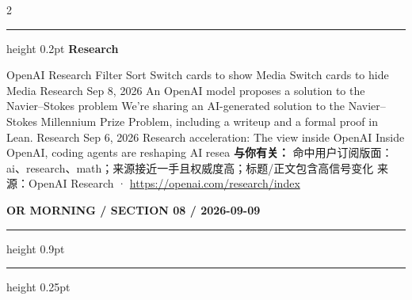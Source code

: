 \documentclass[10.5pt]{ctexart}
\begin{document}
\begin{multicols}{2}
\vspace{2mm}
\hrule height 0.2pt
\vspace{2mm}
{\large\bfseries Research}\par
OpenAI Research Filter Sort Switch cards to show Media Switch cards to hide Media Research Sep 8, 2026 An OpenAI model proposes a solution to the Navier–Stokes problem We’re sharing an AI-generated solution to the Navier–Stokes Millennium Prize Problem, including a writeup and a formal proof in Lean. Research Sep 6, 2026 Research acceleration: The view inside OpenAI Inside OpenAI, coding agents are reshaping AI resea
\textbf{与你有关：} 命中用户订阅版面：ai、research、math；来源接近一手且权威度高；标题/正文包含高信号变化
{\footnotesize\color{ormuted} 来源：OpenAI Research · \url{https://openai.com/research/index}}
\end{multicols}
\newpage
{\small\bfseries OR MORNING / SECTION 08 / 2026-09-09}
\vspace{2mm}
\hrule height 0.9pt
\vspace{1.5mm}
\hrule height 0.25pt
\vspace{4mm}
\end{document}

